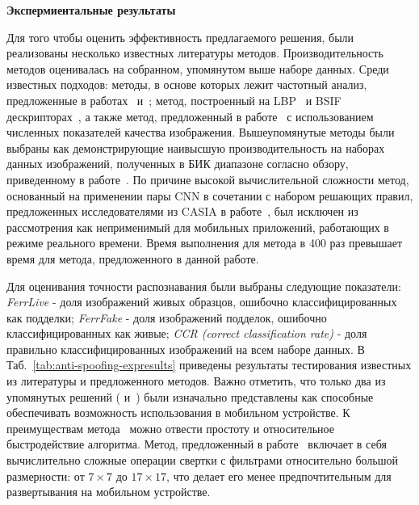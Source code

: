 {\bf Экспермиентальные результаты}
\label{sec:anti-spoofing-experimental}

Для того чтобы оценить эффективность предлагаемого решения, были реализованы несколько известных литературы методов. Производительность методов оценивалась на собранном, упомянутом выше наборе данных. Среди известных подходов: методы, в основе которых лежит частотный анализ, предложенные в работах~\cite{czajka_2013} и~\cite{he_2008}; метод, построенный на LBP~\cite{gupta_2014} и BSIF дескрипторах~\cite{raghavendra_2015}, а также метод, предложенный в работе~\cite{sequeira_2014_2} с использованием численных показателей качества изображения. Вышеупомянутые методы были выбраны как демонстрирующие наивысшую производительность на наборах данных изображений, полученных в БИК диапазоне согласно обзору, приведенному в работе~\cite{galbally_2016}. По причине высокой вычислительной сложности метод, основанный на применении пары CNN в сочетании с набором решающих правил, предложенных исследователями из CASIA в работе~\cite{livdet_2017}, был исключен из рассмотрения как неприменимый для мобильных приложений, работающих в режиме реального времени. Время выполнения для метода в 400 раз превышает время для метода, предложенного в данной работе.

Для оценивания точности распознавания были выбраны следующие показатели: \textit{FerrLive} - доля изображений живых образцов, ошибочно классифицированных как подделки; \textit{FerrFake} - доля изображений подделок, ошибочно классифицированных как живые; \textit{CCR (correct classification rate)} - доля правильно классифицированных изображений на всем наборе данных. В Таб.~\ref{tab:anti-spoofing-expresults} приведены результаты тестирования известных из литературы и предложенного методов. Важно отметить, что только два из упомянутых решений (\cite{raghavendra_2015} и~\cite{sequeira_2014_2}) были изначально представлены как способные обеспечивать возможность использования в мобильном устройстве. К преимуществам метода~\cite{sequeira_2014_2} можно отвести простоту и относительное быстродействие алгоритма. Метод, предложенный в работе~\cite{raghavendra_2015} включает в себя вычислительно сложные операции свертки с фильтрами относительно большой размерности: от $7\times7$ до $17\times17$, что делает его менее предпочтительным для развертывания на мобильном устройстве.

